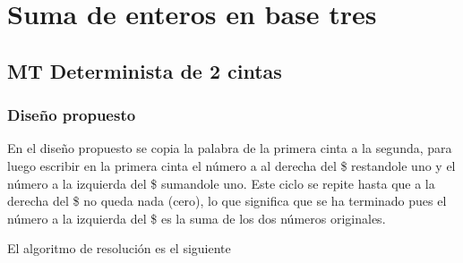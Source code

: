 \section{Suma de enteros en base tres}


\subsection{MT Determinista de 2 cintas}

\subsubsection*{Diseño propuesto}

En el diseño propuesto se copia la palabra de la primera cinta a la segunda, para luego escribir en la primera cinta el número a al derecha del \$ restandole uno y el número a la izquierda del \$ sumandole uno. Este ciclo se repite hasta que a la derecha del \$ no queda nada (cero), lo que significa que se ha terminado pues el número a la izquierda del \$ es la suma de los dos números originales.\medskip

El algoritmo de resolución es el siguiente

